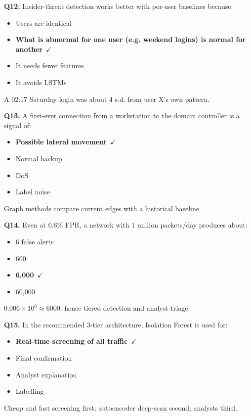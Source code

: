 \documentclass[11pt]{article}
\begin{document}
{\noindent\textbf{Q12.} Insider-threat detection works better with per-user baselines because:\begin{itemize}[leftmargin=2.2em,itemsep=0pt,topsep=1pt]\item[A.] Users are identical\item[\textbf{B.}] \textbf{What is abnormal for one user (e.g. weekend logins) is normal for another}~{\color{GrnN}$\checkmark$}\item[C.] It needs fewer features\item[D.] It avoids LSTMs\end{itemize} A 02:17 Saturday login was about 4 s.d. from user X's own pattern.\par\medskip

\noindent\textbf{Q13.} A first-ever connection from a workstation to the domain controller is a signal of:\begin{itemize}[leftmargin=2.2em,itemsep=0pt,topsep=1pt]\item[\textbf{A.}] \textbf{Possible lateral movement}~{\color{GrnN}$\checkmark$}\item[B.] Normal backup\item[C.] DoS\item[D.] Label noise\end{itemize} Graph methods compare current edges with a historical baseline.\par\medskip

\noindent\textbf{Q14.} Even at 0.6\% FPR, a network with 1 million packets/day produces about:\begin{itemize}[leftmargin=2.2em,itemsep=0pt,topsep=1pt]\item[A.] 6 false alerts\item[B.] 600\item[\textbf{C.}] \textbf{6,000}~{\color{GrnN}$\checkmark$}\item[D.] 60,000\end{itemize} $0.006\times10^6\approx6000$: hence tiered detection and analyst triage.\par\medskip

\noindent\textbf{Q15.} In the recommended 3-tier architecture, Isolation Forest is used for:\begin{itemize}[leftmargin=2.2em,itemsep=0pt,topsep=1pt]\item[\textbf{A.}] \textbf{Real-time screening of all traffic}~{\color{GrnN}$\checkmark$}\item[B.] Final confirmation\item[C.] Analyst explanation\item[D.] Labelling\end{itemize} Cheap and fast screening first; autoencoder deep-scan second; analysts third.\par\medskip

}
\end{document}
